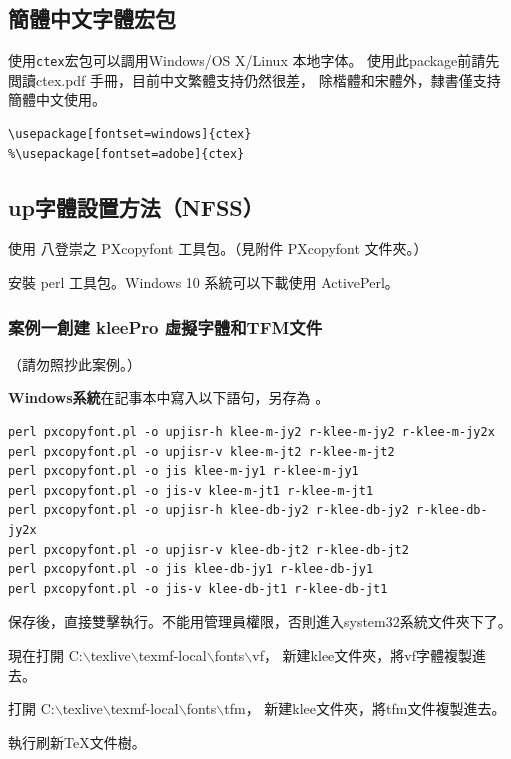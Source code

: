 \subsection{簡體中文字體宏包}
\par
使用\verb+ctex+宏包可以調用Windows/OS X/Linux 本地字体。
使用此package前請先閲讀ctex.pdf 手冊，目前中文繁體支持仍然很差，
除楷體和宋體外，隸書僅支持簡體中文使用。
\begin{lstlisting}[firstnumber=1]
\usepackage[fontset=windows]{ctex}
%\usepackage[fontset=adobe]{ctex}
\end{lstlisting}


\subsection{{up\LaTeXe}字體設置方法（NFSS）}

\par{}使用 八登崇之 PXcopyfont 工具包。（見附件 PXcopyfont 文件夾。）
\par{}安裝 perl 工具包。Windows 10 系統可以下載使用 {ActivePerl}。

\subsubsection*{案例一創建 {kleePro} 虛擬字體和TFM文件}

（請勿照抄此案例。）

\par{}{\bfseries{Windows系統}}在記事本中寫入以下語句，另存為 。
\begin{lstlisting}[firstnumber=1]
perl pxcopyfont.pl -o upjisr-h klee-m-jy2 r-klee-m-jy2 r-klee-m-jy2x
perl pxcopyfont.pl -o upjisr-v klee-m-jt2 r-klee-m-jt2
perl pxcopyfont.pl -o jis klee-m-jy1 r-klee-m-jy1
perl pxcopyfont.pl -o jis-v klee-m-jt1 r-klee-m-jt1
perl pxcopyfont.pl -o upjisr-h klee-db-jy2 r-klee-db-jy2 r-klee-db-jy2x
perl pxcopyfont.pl -o upjisr-v klee-db-jt2 r-klee-db-jt2
perl pxcopyfont.pl -o jis klee-db-jy1 r-klee-db-jy1
perl pxcopyfont.pl -o jis-v klee-db-jt1 r-klee-db-jt1
\end{lstlisting}

\par{}保存後，直接雙擊執行。不能用管理員權限，否則進入system32系統文件夾下了。
\par{}現在打開
{\color{red}C:$\backslash$texlive$\backslash$texmf-local$\backslash$fonts$\backslash$vf}，
新建klee文件夾，將vf字體複製進去。
\par{}打開
{\color{red}C:$\backslash$texlive$\backslash$texmf-local$\backslash$fonts$\backslash$tfm}，
新建klee文件夾，將tfm文件複製進去。
\par{}執行刷新{\TeX}文件樹。


